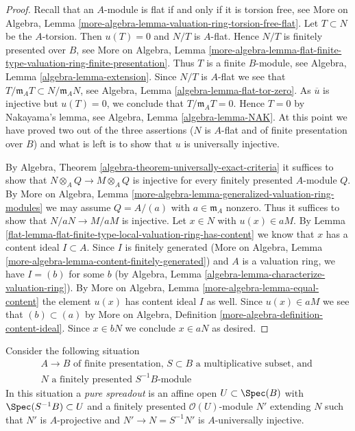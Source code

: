 \begin{proof}

Recall that an $A$-module is flat if and only if it is torsion free, see
More on Algebra, Lemma
\ref{more-algebra-lemma-valuation-ring-torsion-free-flat}.
Let $T \subset N$ be the $A$-torsion. Then $u(T) = 0$ and
$N/T$ is $A$-flat. Hence $N/T$ is finitely presented over $B$, see
More on Algebra, Lemma
\ref{more-algebra-lemma-flat-finite-type-valuation-ring-finite-presentation}.
Thus $T$ is a finite $B$-module, see
Algebra, Lemma \ref{algebra-lemma-extension}.
Since $N/T$ is $A$-flat we see that
$T/\mathfrak m_A T \subset N/\mathfrak m_A N$, see
Algebra, Lemma \ref{algebra-lemma-flat-tor-zero}.
As $\overline{u}$ is injective but $u(T) = 0$, we conclude that
$T/\mathfrak m_A T = 0$. Hence $T = 0$ by Nakayama's lemma, see
Algebra, Lemma \ref{algebra-lemma-NAK}. At this point we have
proved two out of the three assertions ($N$ is $A$-flat and
of finite presentation over $B$) and what is left is to show that
$u$ is universally injective.

\medskip\noindent
By Algebra, Theorem \ref{algebra-theorem-universally-exact-criteria}
it suffices to show that $N \otimes_A Q \to M \otimes_A Q$ is injective
for every finitely presented $A$-module $Q$. By
More on Algebra, Lemma
\ref{more-algebra-lemma-generalized-valuation-ring-modules}
we may assume $Q = A/(a)$ with $a \in \mathfrak m_A$ nonzero.
Thus it suffices to show that $N/aN \to M/aM$ is injective.
Let $x \in N$ with $u(x) \in aM$. By
Lemma \ref{flat-lemma-flat-finite-type-local-valuation-ring-has-content}
we know that $x$ has a content ideal $I \subset A$. Since
$I$ is finitely generated
(More on Algebra, Lemma \ref{more-algebra-lemma-content-finitely-generated})
and $A$ is a valuation ring, we have $I = (b)$ for some $b$
(by Algebra, Lemma \ref{algebra-lemma-characterize-valuation-ring}).
By More on Algebra, Lemma \ref{more-algebra-lemma-equal-content}
the element $u(x)$ has content ideal $I$ as well.
Since $u(x) \in aM$ we see that $(b) \subset (a)$
by More on Algebra, Definition \ref{more-algebra-definition-content-ideal}.
Since $x \in bN$ we conclude $x \in aN$ as desired.
\end{proof}

Consider the following situation
\begin{equation}
\label{equation-star}
\begin{matrix}
A \to B\text{ of finite presentation, }S \subset B
\text{ a multiplicative subset, and }\\
N\text{ a finitely presented }S^{-1}B\text{-module}
\end{matrix}
\end{equation}
In this situation a {\it pure spreadout} is an affine open
$U \subset \Spec(B)$ with $\Spec(S^{-1}B) \subset U$ and a
finitely presented $\mathcal{O}(U)$-module $N'$ extending $N$
such that $N'$ is $A$-projective and $N' \to N = S^{-1}N'$
is $A$-universally injective.

